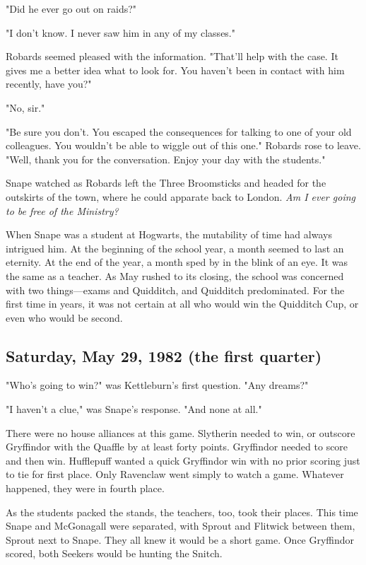 "Did he ever go out on raids?"

"I don't know. I never saw him in any of my classes."

Robards seemed pleased with the information. "That'll help with the case. It gives me a better idea what to look for. You haven't been in contact with him recently, have you?"

"No, sir."

"Be sure you don't. You escaped the consequences for talking to one of your old colleagues. You wouldn't be able to wiggle out of this one." Robards rose to leave. "Well, thank you for the conversation. Enjoy your day with the students."

Snape watched as Robards left the Three Broomsticks and headed for the outskirts of the town, where he could apparate back to London. \emph{Am I ever going to be free of the Ministry?}

When Snape was a student at Hogwarts, the mutability of time had always intrigued him. At the beginning of the school year, a month seemed to last an eternity. At the end of the year, a month sped by in the blink of an eye. It was the same as a teacher. As May rushed to its closing, the school was concerned with two things—exams and Quidditch, and Quidditch predominated. For the first time in years, it was not certain at all who would win the Quidditch Cup, or even who would be second.

\subsection{Saturday, May 29, 1982 (the first quarter)}

"Who's going to win?" was Kettleburn's first question. "Any dreams?"

"I haven't a clue," was Snape's response. "And none at all."

There were no house alliances at this game. Slytherin needed to win, or outscore Gryffindor with the Quaffle by at least forty points. Gryffindor needed to score and then win. Hufflepuff wanted a quick Gryffindor win with no prior scoring just to tie for first place. Only Ravenclaw went simply to watch a game. Whatever happened, they were in fourth place.

As the students packed the stands, the teachers, too, took their places. This time Snape and McGonagall were separated, with Sprout and Flitwick between them, Sprout next to Snape. They all knew it would be a short game. Once Gryffindor scored, both Seekers would be hunting the Snitch.

